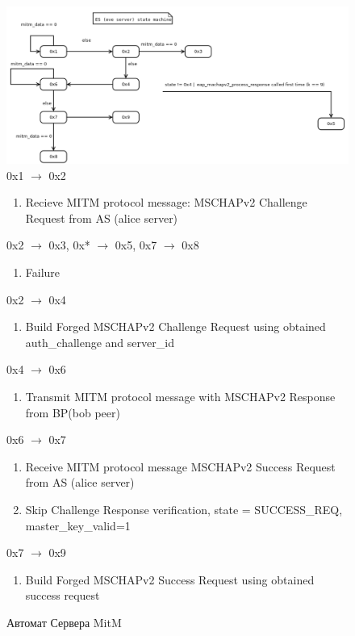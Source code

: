 \documentclass{extarticle}
\begin{document}
\begin{figure}
  \centering \includegraphics[scale=0.5]
    {res/eve-server-mitm-state-machine-diagram.png}
  0x1 $\rightarrow$ 0x2
  \begin{enumerate}
    \item Recieve MITM protocol message: MSCHAPv2 Challenge
      Request from AS (alice server)
  \end{enumerate}
  0x2 $\rightarrow$ 0x3, 0x* $\rightarrow$ 0x5, 0x7 $\rightarrow$ 0x8
  \begin{enumerate}
    \item Failure
  \end{enumerate}
  0x2 $\rightarrow$ 0x4
  \begin{enumerate}
    \item Build Forged MSCHAPv2 Challenge
      Request using obtained auth\_challenge and server\_id
  \end{enumerate}
  0x4 $\rightarrow$ 0x6
  \begin{enumerate}
    \item Transmit MITM protocol message with MSCHAPv2 Response from BP(bob peer)
  \end{enumerate}
  0x6 $\rightarrow$ 0x7
  \begin{enumerate}
    \item Receive MITM protocol message MSCHAPv2 Success
      Request from AS (alice server)
    \item Skip Challenge Response verification,
      state = SUCCESS\_REQ, master\_key\_valid=1
  \end{enumerate}
  0x7 $\rightarrow$ 0x9
  \begin{enumerate}
    \item Build Forged MSCHAPv2 Success Request using obtained success request
  \end{enumerate}
  \caption{Автомат Сервера MitM}
\end{figure}
\end{document}
